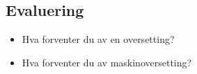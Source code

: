 \documentclass[a4paper,english,12pt]{article}
\begin{document}
\begin{spacing}{1.0}
\section{Evaluering}


\begin{itemize}
\item Hva forventer du av en oversetting?  
\item Hva forventer du av maskinoversetting?
\end{itemize}

\end{spacing}
\end{document}
